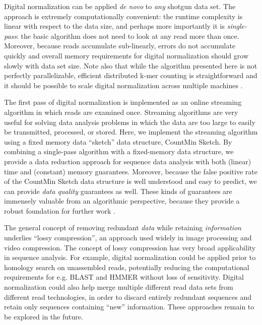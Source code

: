 \documentclass[10pt]{article}
\begin{document}
Digital normalization can be applied {\em de novo} to {\em any}
shotgun data set.  The approach is extremely computationally
convenient: the runtime complexity is linear with respect to the data
size, and perhaps more importantly it is {\em single-pass}: the basic
algorithm does not need to look at any read more than once.  Moreover,
because reads accumulate sub-linearly, errors do not accumulate
quickly and overall memory requirements for digital normalization
should grow slowly with data set size.  Note also that while the
algorithm presented here is not perfectly parallelizable, efficient
distributed k-mer counting is straightforward and it should be
possible to scale digital normalization across multiple machines
\cite{pubmed19357099}.

The first pass of digital normalization is implemented as an online
streaming algorithm in which reads are examined once.  Streaming
algorithms are very useful for solving data analysis problems in which
the data are too large to easily be transmitted, processed, or
stored.  Here, we implement the streaming algorithm using a fixed
memory data ``sketch'' data structure, CountMin Sketch.  By combining
a single-pass algorithm with a fixed-memory data structure, we provide
a data reduction approach for sequence data analysis with both
(linear) time and (constant) memory guarantees. Moreover, because the
false positive rate of the CountMin Sketch data structure is well
understood and easy to predict, we can provide {\em data quality}
guarantees as well.  These kinds of guarantees are immensely
valuable from an algorithmic perspective, because they provide a
robust foundation for further work \cite{muthukrishnan2005data}.

The general concept of removing redundant {\em data} while retaining
{\em information} underlies ``lossy compression'', an approach used
widely in image processing and video compression.  The concept of
lossy compression has very broad applicability in sequence analysis.
For example, digital normalization could be applied prior to homology
search on unassembled reads, potentially reducing the computational
requirements for e.g. BLAST and HMMER without loss of sensitivity.
Digital normalization could also help merge multiple different read
data sets from different read technologies, in order to discard
entirely redundant sequences and retain only sequences containing
``new'' information.  These approaches remain to be explored in the future.
\end{document}
